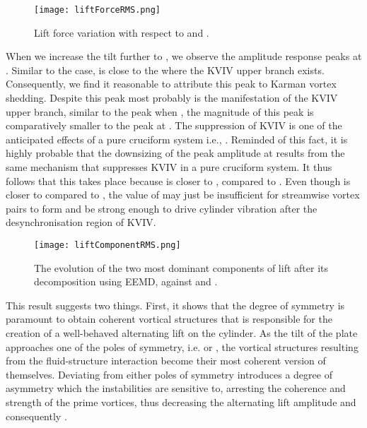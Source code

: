 \documentclass[a4paper]{article}
\begin{document}
\begin{figure}[h]
  \centering
  \texttt{[image: liftForceRMS.png]}
  \caption{Lift force variation with respect to \ured{} and \ptlt{}.}
  \label{fig:liftevo}
\end{figure}

When we increase the tilt further to \ptlt{} \es{} \rth{}, we observe the amplitude response peaks at \ured{} \es{} \urtw{}. Similar to the \rtw{} case, \ured{} \es{} \urtw{} is close to the \ured{} where the KVIV upper branch exists. Consequently, we find it reasonable to attribute this peak to Karman vortex shedding. Despite this peak most probably is the manifestation of the KVIV upper branch, similar to the peak when \ptlt{} \es{} \rtw{}, the magnitude of this peak is comparatively smaller to the peak at \rtw{}. The suppression of KVIV is one of the anticipated effects of a pure cruciform system i.e., \ptlt{} \es{} \rfo{} \parencite{Shirakashi1989}. Reminded of this fact, it is highly probable that the downsizing of the peak amplitude at \rth{} results from the same mechanism that suppresses KVIV in a pure cruciform system. It thus follows that this takes place because \ptlt{} \es{} \rth{} is closer to \rfo{}, compared to \rtw{}. Even though \ptlt{} \es{} \rth{} is closer to \rfo{} compared to \rtw{}, the value of \rth{} may just be insufficient for streamwise vortex pairs to form and be strong enough to drive cylinder vibration after the desynchronisation region of KVIV.

\begin{figure}[h]
  \centering
  \texttt{[image: liftComponentRMS.png]}
  \caption{The evolution of the two most dominant components of lift after its decomposition using EEMD, against \ured{} and \ptlt{}.}
  \label{fig:liftcomp}
\end{figure}

This result suggests two things. First, it shows that the degree of symmetry is paramount to obtain coherent vortical structures that is responsible for the creation of a well-behaved alternating lift on the cylinder. As the tilt of the plate approaches one of the poles of symmetry, i.e. \ptlt{} \es{} \rze{} or \rfo{}, the vortical structures resulting from the fluid-structure interaction become their most coherent version of themselves. Deviating from either poles of symmetry introduces a degree of asymmetry which the instabilities are sensitive to, arresting the coherence and strength of the prime vortices, thus decreasing the alternating lift amplitude and consequently \yrms{}.
\end{document}
